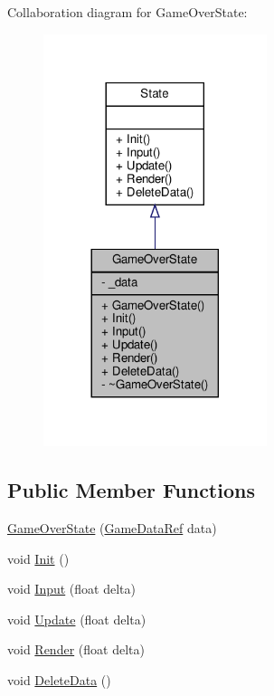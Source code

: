Collaboration diagram for Game\+Over\+State\+:
\nopagebreak
\begin{figure}[H]
\begin{center}
\leavevmode
\includegraphics[width=185pt]{classGameOverState__coll__graph}
\end{center}
\end{figure}
\subsection*{Public Member Functions}
\begin{DoxyCompactItemize}
\item 
\hyperlink{classGameOverState_a90dea0468b4719169fd8f5d157e20baf}{Game\+Over\+State} (\hyperlink{game_8h_a513c9dd465a0df41dbb4daf40cc717c2}{Game\+Data\+Ref} data)
\item 
void \hyperlink{classGameOverState_aa3d4f165ff735552f16132e929d369c2}{Init} ()
\item 
void \hyperlink{classGameOverState_adb4be2a5c6292d020999c2da9588ebfc}{Input} (float delta)
\item 
void \hyperlink{classGameOverState_a4dc49d576a9435531f502660119800a9}{Update} (float delta)
\item 
void \hyperlink{classGameOverState_ac9c9ef71b0a12940ac5caa7763f23fdc}{Render} (float delta)
\item 
void \hyperlink{classGameOverState_afb6fa68ff0c5e4f83725de8059c4f7c8}{Delete\+Data} ()
\end{DoxyCompactItemize}
